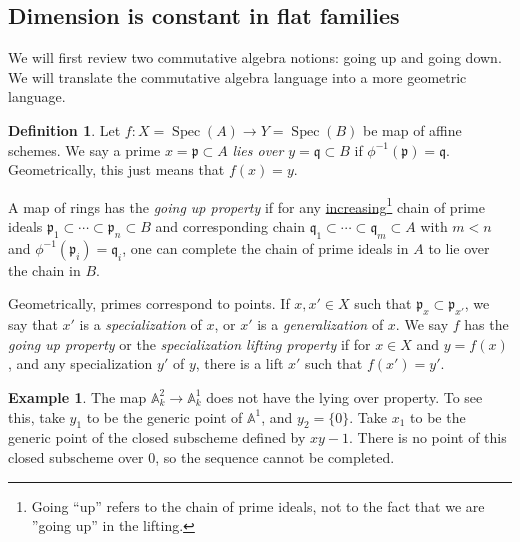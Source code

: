 \documentclass[10pt]{article}
\theoremstyle{definition}
\newtheorem{exmp}[thm]{Example}
\newtheorem{defn}[thm]{Definition}
\DeclareMathOperator{\Spec}{Spec}
\newcommand{\AAA}{\mathbb{A}}
\newcommand{\mf}{\mathfrak}
\newcommand{\PP}{\mathbb{P}}
\newcommand{\G}{\mathbb{G}}
\newcommand{\todo}[1]{\textbf{\textcolor{red}{TODO #1}}}
\begin{document}
%
%




\subsection{Dimension is constant in flat families}

We will first review two commutative algebra notions: going up and going down.  We will translate the commutative algebra language into a more geometric language.

\begin{defn}
Let $f: X = \Spec(A) \rightarrow Y = \Spec(B)$ be map of affine schemes.  We say a prime $x = \mf{p} \subset A$ \emph{lies over} $y = \mf{q} \subset B$ if $\phi^{-1}(\mf{p}) = \mf{q}$.  Geometrically, this just means that $f(x) = y$.

A map of rings has the \emph{going up property} if for any \underline{increasing}\footnote{Going ``up'' refers to the chain of prime ideals, not to the fact that we are ''going up'' in the lifting.} chain of prime ideals $\mf{p}_1 \subset \cdots \subset \mf{p}_n \subset B$ and corresponding chain $\mf{q}_1 \subset \cdots \subset \mf{q}_m \subset A$ with $m<n$ and $\phi^{-1}(\mf{p}_i) = \mf{q}_i$, one can complete the chain of prime ideals in $A$ to lie over the chain in $B$.

Geometrically, primes correspond to points.  If $x,x' \in X$ such that $\mf{p}_x \subset \mf{p}_{x'}$, we say that $x'$ is a \emph{specialization} of $x$, or $x'$ is a \emph{generalization} of $x$.  We say $f$ has the \emph{going up property} or the \emph{specialization lifting property} if for $x \in X$ and $y = f(x)$, and any specialization $y'$ of $y$, there is a lift $x'$ such that $f(x') = y'$.
\end{defn}



\begin{exmp}
The map $\mathbb{A}^2_k \rightarrow \mathbb{A}^1_k$ does not have the lying over property.  To see this, take $y_1$ to be the generic point of $\AAA^1$, and $y_2 = \{0\}$.  Take $x_1$ to be the generic point of the closed subscheme defined by $xy-1$.  There is no point of this closed subscheme over $0$, so the sequence cannot be completed.
\end{exmp}
\end{document}
